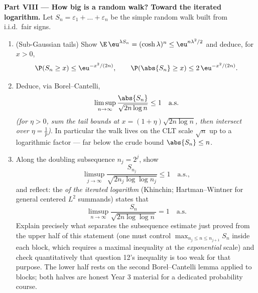 \begin{problem}
\medskip
\noindent\textbf{Part VIII --- How big is a random walk?
Toward the iterated logarithm.} Let $S_n = \varepsilon_1 +
\dots + \varepsilon_n$ be the simple random walk built from
i.i.d.\ fair signs.
\begin{enumerate}[resume]
  \item (Sub-Gaussian tails) Show $\E\,\eu^{\lambda S_n} =
        (\cosh\lambda)^n \leq \eu^{n\lambda^2/2}$ and
        deduce, for $x > 0$,
        \[
        \P(S_n \geq x) \leq \eu^{-x^2/(2n)},
        \qquad
        \P(\abs{S_n} \geq x) \leq 2\,\eu^{-x^2/(2n)} .
        \]
  \item Deduce, via Borel--Cantelli,
        \[
        \limsup_{n\to\infty}\frac{\abs{S_n}}
        {\sqrt{2n\log n}} \leq 1 \quad\text{a.s.}
        \]
        \emph{(for $\eta > 0$, sum the tail bounds at $x =
        (1 + \eta)\sqrt{2n\log n}$, then intersect over
        $\eta = \frac1p$)}. In particular the walk lives on
        the CLT scale $\sqrt n$ up to a logarithmic factor
        --- far below the crude bound $\abs{S_n} \leq n$.
  \item Along the doubling subsequence $n_j = 2^j$, show
        \[
        \limsup_{j\to\infty}\frac{S_{n_j}}
        {\sqrt{2n_j\log\log n_j}} \leq 1 \quad\text{a.s.},
        \]
        and reflect: the \emph{ of the iterated
        logarithm} (Khinchin; Hartman--Wintner for general
        centered $L^2$ summands) states that
        \[
        \limsup_{n\to\infty}\frac{S_n}
        {\sqrt{2n\log\log n}} = 1 \quad\text{a.s.}
        \]
        Explain precisely what separates the subsequence
        estimate just proved from the upper half of this
        statement (one must control $\max_{n_j \leq n \leq
        n_{j+1}}S_n$ inside each block, which requires a
        maximal inequality at the \emph{exponential} scale)
        and check quantitatively that question 12's
        inequality is too weak for that purpose. The lower
        half rests on the second Borel--Cantelli lemma
        applied to  blocks; both halves are
        honest Year 3 material for a dedicated probability
        course.


\end{enumerate}
\end{problem}
